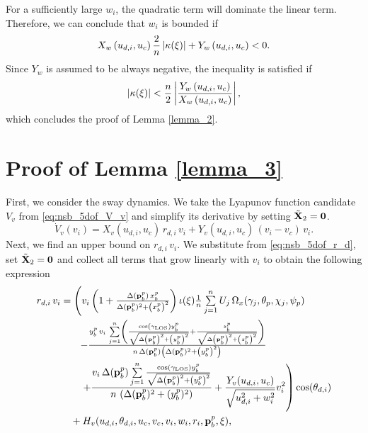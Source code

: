For a sufficiently large $w_i$, the quadratic term will dominate the linear term.
Therefore, we can conclude that $w_i$ is bounded if 
\begin{equation}
    X_w\left(u_{d,i}, u_c\right)\frac{2}{n}\left|\kappa(\xi)\right| + Y_w\left(u_{d,i}, u_c\right) < 0.
\end{equation}
Since $Y_w$ is assumed to be always negative, the inequality is satisfied if
\begin{equation}
    \left|\kappa(\xi)\right| < \frac{n}{2}\left|\frac{Y_w\left(u_{d,i}, u_c\right)}{X_w\left(u_{d,i}, u_c\right)}\right|,
\end{equation}
which concludes the proof of Lemma \ref{lemma_2}.

\section{Proof of Lemma \ref{lemma_3}}
\label{app:5dof_nsb_lemma_3}
First, we consider the sway dynamics.
We take the Lyapunov function candidate $V_v$ from \eqref{eq:nsb_5dof_V_v} and simplify its derivative by setting $\tilde{\mathbf{X}}_2 = \mathbf{0}$.
\begin{equation}
    \dot{V}_v(v_i) = X_v\left(u_{d,i}, u_c\right)\,r_{d,i}\,v_i + Y_v\left(u_{d,i}, u_c\right)\,\left(v_i - v_c\right)\,v_i. \label{eq:nsb_5dof_V_v_dot_3}
\end{equation}
Next, we find an upper bound on $r_{d,i}\,v_i$.
We substitute from \eqref{eq:nsb_5dof_r_d}, set $\tilde{\mathbf{X}}_2 = \mathbf{0}$ and collect all terms that grow linearly with $v_i$ to obtain the following expression
\begin{equation}
    \begin{split}
        {r_{d,i}\,v_i} &= \scale[1]{\left( v_i\left(1 + \frac{\Delta(\mat{p}_b^p)\,x_b^p}{\Delta(\mat{p}_b^p)^2 + \left(x_b^p\right)^2}\right) \iota(\xi) \frac{1}{n} \sum\limits_{j=1}^n U_j\,\Omega_x(\gamma_j, \theta_p, \chi_j, \psi_p) \right.} \\
        &\qquad \scale[1]{
        - \frac{y_b^p\,v_i\,\sum\limits_{j=1}^n\left(\frac{\cos\left(\gamma_{\rm LOS}\right)y_b^p}{\sqrt{\Delta\left(\mat{p}_b^p\right)^2 + \left(y_b^p\right)^2}} + \frac{z_b^p}{\sqrt{\Delta\left(\mat{p}_b^p\right)^2 + \left(z_b^p\right)^2}}\right)}{n\,\Delta(\mat{p}_b^p)\left(\Delta(\mat{p}_b^p)^2 + \left(y_b^p\right)^2\right)} } \\
        &\qquad \left. + \frac{v_i\,\Delta(\mat{p}_b^p)\sum\limits_{j=1}^n\frac{\cos\left(\gamma_{\rm LOS}\right)y_b^p}{\sqrt{\Delta\left(\mat{p}_b^p\right)^2 + \left(y_b^p\right)^2}}}{n\,\left(\Delta(\mat{p}_b^p)^2 + (y_b^p)^2\right)} + \frac{Y_v(u_{d,i}, u_c)}{\sqrt{u_{d,i}^2 + w_i^2}}v_i^2 \right) \cos(\theta_{d,i}) \\
        &\quad + H_v(u_{d,i}, \theta_{d,i}, u_c, v_c, v_i, w_i, r_i, \mat{p}_b^p, \xi),
    \end{split}
\end{equation}

